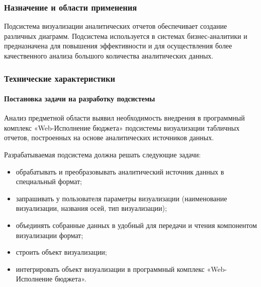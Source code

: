 \documentclass[a4paper]{extarticle}
\begin{document}
\subsubsection{Назначение и области применения}
Подсистема визуализации аналитических отчетов обеспечивает создание различных диаграмм. Подсистема используется в системах бизнес-аналитики и предназначена для повышения эффективности и для осуществления более качественного анализа большого количества аналитических данных.

\subsubsection{Технические характеристики}

\paragraph{Постановка задачи на разработку подсистемы}
Анализ предметной области выявил необходимость внедрения в программный комплекс «Web-Исполнение бюджета» подсистемы визуализации табличных отчетов, построенных на основе аналитических источников данных.\par
Разрабатываемая подсистема должна решать следующие задачи:
\begin{itemize}
  \item обрабатывать и преобразовывать аналитический источник данных в специальный формат;
  \item запрашивать у пользователя параметры визуализации (наименование визуализации, названия осей, тип визуализации);
  \item объединять собранные данных в удобный для передачи и чтения компонентом визуализации формат;
  \item строить объект визуализации;
  \item интегрировать объект визуализации в программный комплекс «Web-Исполнение бюджета».
\end{itemize}\par
\end{document}

